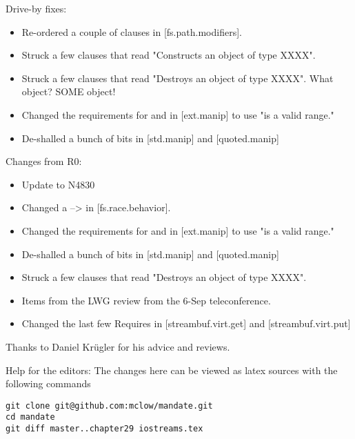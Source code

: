 Drive-by fixes:
\begin{itemize}
\item{Re-ordered a couple of clauses in [fs.path.modifiers]. }
\item{Struck a few clauses that read "Constructs an object of type XXXX".}
\item{Struck a few clauses that read "Destroys an object of type XXXX". What object? SOME object!}
\item{Changed the requirements for  and  in [ext.manip] to use "is a valid range."}
\item{De-shalled a bunch of bits in [std.manip] and [quoted.manip]}
\end{itemize}


Changes from R0:
\begin{itemize}
\item{Update to N4830}
\item{Changed a \requires --> \expects in [fs.race.behavior].}
\item{Changed the requirements for  and  in [ext.manip] to use "is a valid range."}
\item{De-shalled a bunch of bits in [std.manip] and [quoted.manip]}
\item{Struck a few clauses that read "Destroys an object of type XXXX".}
\item{Items from the LWG review from the 6-Sep teleconference.}
\item{Changed the last few Requires in [streambuf.virt.get] and [streambuf.virt.put]}
\end{itemize}

Thanks to Daniel Krügler for his advice and reviews.

\vfill
Help for the editors: The changes here can be viewed as latex sources with the following commands
\begin{verbatim}
git clone git@github.com:mclow/mandate.git
cd mandate
git diff master..chapter29 iostreams.tex
\end{verbatim}
